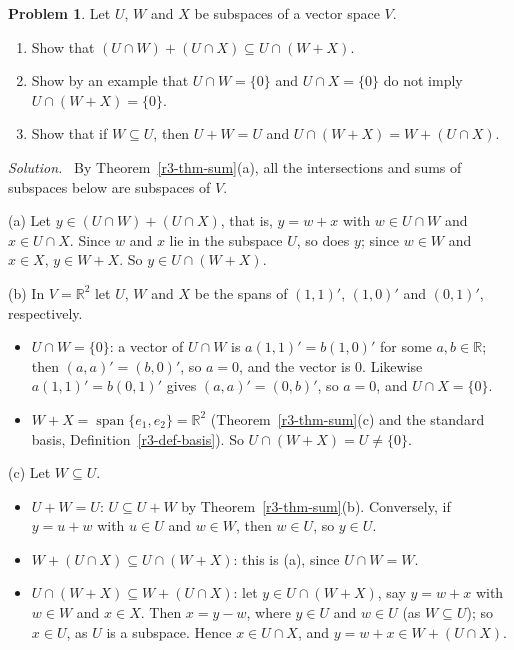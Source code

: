 \documentclass[12pt]{article}
\newcommand{\R}{\mathbb R}
\DeclareMathOperator{\Span}{span}
\theoremstyle{definition}
\newtheorem{problem}{Problem}
\newenvironment{solution}{\par\noindent\textit{Solution.}\ }{\par\smallskip}
\begin{document}
\begin{problem}\label{r3-pr-modular}
Let \(U\), \(W\) and \(X\) be subspaces of a vector space \(V\).
\begin{enumerate}
\item Show that \((U\cap W)+(U\cap X)\subseteq U\cap(W+X)\).
\item Show by an example that \(U\cap W=\{0\}\) and \(U\cap X=\{0\}\) do not imply \(U\cap(W+X)=\{0\}\).
\item Show that if \(W\subseteq U\), then \(U+W=U\) and \(U\cap(W+X)=W+(U\cap X)\).
\end{enumerate}
\end{problem}
\begin{solution}
By Theorem~\ref{r3-thm-sum}(a), all the intersections and sums of subspaces below are subspaces of \(V\).

(a) Let \(y\in(U\cap W)+(U\cap X)\), that is, \(y=w+x\) with \(w\in U\cap W\) and \(x\in U\cap X\). Since \(w\) and
\(x\) lie in the subspace \(U\), so does \(y\); since \(w\in W\) and \(x\in X\), \(y\in W+X\). So \(y\in U\cap(W+X)\).

(b) In \(V=\R^2\) let \(U\), \(W\) and \(X\) be the spans of \((1,1)'\), \((1,0)'\) and \((0,1)'\), respectively.
\begin{itemize}
\item \(U\cap W=\{0\}\): a vector of \(U\cap W\) is \(a(1,1)'=b(1,0)'\) for some \(a,b\in\R\); then
\((a,a)'=(b,0)'\), so \(a=0\), and the vector is \(0\). Likewise \(a(1,1)'=b(0,1)'\) gives \((a,a)'=(0,b)'\), so
\(a=0\), and \(U\cap X=\{0\}\).
\item \(W+X=\Span\{e_1,e_2\}=\R^2\) (Theorem~\ref{r3-thm-sum}(c) and the standard basis,
Definition~\ref{r3-def-basis}). So \(U\cap(W+X)=U\ne\{0\}\).
\end{itemize}
(c) Let \(W\subseteq U\).
\begin{itemize}
\item \(U+W=U\): \(U\subseteq U+W\) by Theorem~\ref{r3-thm-sum}(b). Conversely, if \(y=u+w\) with \(u\in U\) and
\(w\in W\), then \(w\in U\), so \(y\in U\).
\item \(W+(U\cap X)\subseteq U\cap(W+X)\): this is (a), since \(U\cap W=W\).
\item \(U\cap(W+X)\subseteq W+(U\cap X)\): let \(y\in U\cap(W+X)\), say \(y=w+x\) with \(w\in W\) and \(x\in X\).
Then \(x=y-w\), where \(y\in U\) and \(w\in U\) (as \(W\subseteq U\)); so \(x\in U\), as \(U\) is a subspace.
Hence \(x\in U\cap X\), and \(y=w+x\in W+(U\cap X)\).
\end{itemize}
\end{solution}
\end{document}
